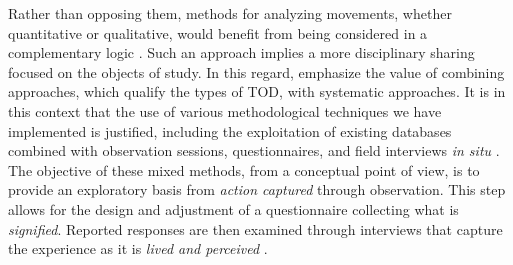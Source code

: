 \begin{refsegment}
Rather than opposing them, methods for analyzing movements, whether quantitative or qualitative, would benefit from being considered in a complementary logic \textcolor{blue}{\autocite[6]{klein_mobilites_2007}}. Such an approach implies a more disciplinary sharing focused on the objects of study. In this regard, \textcolor{blue}{\textcite[4]{higgins_forty_2016}} emphasize the value of combining  approaches, which qualify the types of \acrshort{TOD}, with  systematic approaches. It is in this context that the use of various methodological techniques we have implemented is justified, including the exploitation of existing databases combined with observation sessions, questionnaires, and field interviews \textsl{in situ} \textcolor{blue}{\autocite[128]{dureau_lobservation_2014}}. The objective of these mixed methods, from a conceptual point of view, is to provide an exploratory basis from \textsl{action captured} through observation. This step allows for the design and adjustment of a questionnaire collecting what is \textsl{signified}. Reported responses are then examined through interviews that capture the experience as it is \textsl{lived and perceived} \textcolor{blue}{\autocite[215]{paugam_enquete_2012}}.%


\end{refsegment}
